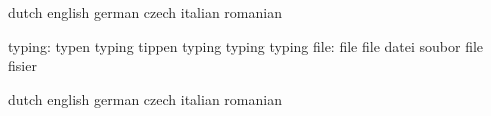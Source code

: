 \stopvariables

\startvariables            dutch                     english
                           german                    czech
                           italian                   romanian

                   typing: typen                     typing
                           tippen                    typing
                           typing                    typing %
                     file: file                      file
                           datei                     soubor
                           file                      fisier

\stopvariables




\startvariables            dutch                     english
                           german                    czech
                           italian                   romanian

